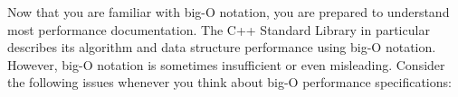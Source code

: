 
Now that you are familiar with big-O notation, you are prepared to understand most performance documentation. The C++ Standard Library in particular describes its algorithm and data structure performance using big-O notation. However, big-O notation is sometimes insufficient or even misleading. Consider the following issues whenever you think about big-O performance specifications:







